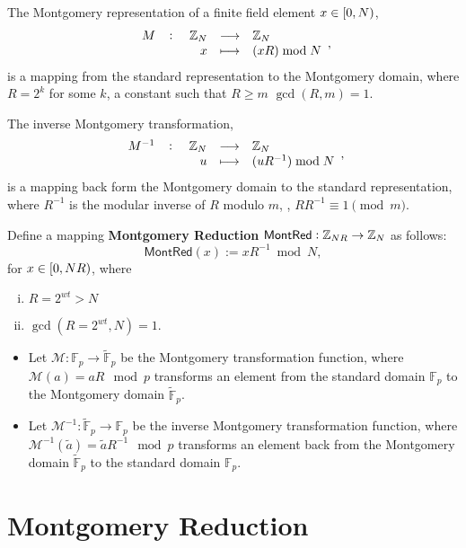 \vspace{8pt}
\begin{tcolorbox}[colframe=defcolor,title={\color{white}\bf The Montgomery Representation and the inverse Montgomery Transformation}]
\begin{definition}
The Montgomery representation of a finite field element $x\in\intco{0,N}$, \[
\fullfunction{M}{\Z_N}{\Z_N}{x}{(xR)\bmod N},
\] is a mapping from the standard representation to the Montgomery domain, where $R=2^k$ for some $k$, a constant such that $R\geq m$ $\gcd(R,m)=1$.

The inverse Montgomery transformation, \[
\fullfunction{M^{-1}}{\Z_N}{\Z_N}{u}{(uR^{-1})\bmod N},
\] is a mapping back form the Montgomery domain to the standard representation, where $R^{-1}$ is the modular inverse of $R$ modulo $m$, \ie, $RR^{-1}\equiv 1\pmod{m}$.
\end{definition}
\end{tcolorbox}

\newpage
\begin{tcolorbox}[colframe=defcolor,title={\color{white}\bf The Montgomery Reduction}]
\begin{definition}
Define a mapping \textbf{Montgomery Reduction} $\mathsf{MontRed}:\mathbb{Z}_{NR}\to\mathbb{Z}_{N}$ as follows: \[
\mathsf{MontRed}(x):=xR^{-1}\bmod N,
\] for $x\in\intco{0,NR}$, where \begin{enumerate}[(i)]
\item $R=2^{wt}>N$
\item $\gcd(R=2^{wt}, N)=1$.
\end{enumerate}
\end{definition}	
\end{tcolorbox}
\begin{itemize}
	\item Let \( \mathcal{M} : \mathbb{F}_p \to \widetilde{\mathbb{F}}_p \) be the Montgomery transformation function, where \( \mathcal{M}(a) = aR \mod p \) transforms an element from the standard domain \( \mathbb{F}_p \) to the Montgomery domain \( \widetilde{\mathbb{F}}_p \).
	\item Let \( \mathcal{M}^{-1} : \widetilde{\mathbb{F}}_p \to \mathbb{F}_p \) be the inverse Montgomery transformation function, where \( \mathcal{M}^{-1}(\widetilde{a}) = \widetilde{a}R^{-1} \mod p \) transforms an element back from the Montgomery domain \( \widetilde{\mathbb{F}}_p \) to the standard domain \( \mathbb{F}_p \).
\end{itemize}

\newpage
\section{Montgomery Reduction}

